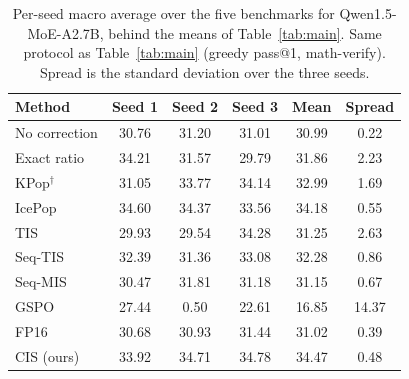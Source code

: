 \begin{table}[h]
\centering
\caption{Per-seed macro average over the five benchmarks for Qwen1.5-MoE-A2.7B, behind the means of Table~\ref{tab:main}. Same protocol as Table~\ref{tab:main} (greedy pass@1, math-verify). Spread is the standard deviation over the three seeds.}
\label{tab:main_macro_seeds}
\footnotesize\setlength{\tabcolsep}{5pt}
\begin{tabular}{lccccc}
\toprule
Method & Seed 1 & Seed 2 & Seed 3 & Mean & Spread \\
\midrule
No correction & 30.76 & 31.20 & 31.01 & 30.99 & 0.22 \\
Exact ratio & 34.21 & 31.57 & 29.79 & 31.86 & 2.23 \\
KPop$^\dagger$ & 31.05 & 33.77 & 34.14 & 32.99 & 1.69 \\
IcePop & 34.60 & 34.37 & 33.56 & 34.18 & 0.55 \\
TIS & 29.93 & 29.54 & 34.28 & 31.25 & 2.63 \\
Seq-TIS & 32.39 & 31.36 & 33.08 & 32.28 & 0.86 \\
Seq-MIS & 30.47 & 31.81 & 31.18 & 31.15 & 0.67 \\
GSPO & 27.44 & 0.50 & 22.61 & 16.85 & 14.37 \\
FP16 & 30.68 & 30.93 & 31.44 & 31.02 & 0.39 \\
CIS (ours) & 33.92 & 34.71 & 34.78 & 34.47 & 0.48 \\
\bottomrule
\end{tabular}
\end{table}

